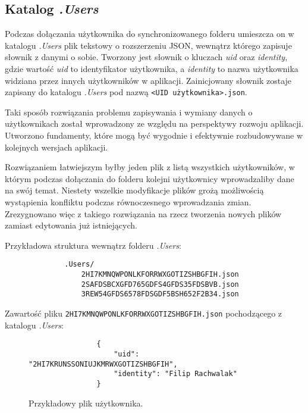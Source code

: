 \subsection{Katalog \emph{.Users}}

Podczas dołączania użytkownika do synchronizowanego folderu umieszcza on w katalogu \emph{.Users} plik tekstowy o rozszerzeniu JSON, wewnątrz którego zapisuje słownik z danymi o sobie. Tworzony jest słownik o kluczach \emph{uid} oraz \emph{identity}, gdzie wartość \emph{uid} to identyfikator użytkownika, a \emph{identity} to nazwa użytkownika widziana przez innych użytkowników w aplikacji. Zainicjowany słownik zostaje zapisany do katalogu \emph{.Users} pod nazwą \texttt{<UID użytkownika>.json}.

Taki sposób rozwiązania problemu zapisywania i wymiany danych o użytkownikach został wprowadzony ze względu na perspektywy rozwoju aplikacji. Utworzono fundamenty, które mogą być wygodnie i efektywnie rozbudowywane w kolejnych wersjach aplikacji.

Rozwiązaniem łatwiejszym byłby jeden plik z listą wszystkich użytkowników, w którym podczas dołączania do folderu kolejni użytkownicy wprowadzaliby dane na swój temat. Niestety wszelkie modyfikacje plików grożą możliwością wystąpienia konfliktu podczas równoczesnego wprowadzania zmian. Zrezygnowano więc z takiego rozwiązania na rzecz tworzenia nowych plików zamiast edytowania już istniejących.

Przykładowa struktura wewnątrz folderu \emph{.Users}:

\begin{minipage}{\linewidth}
\vspace{1em}
\begin{verbatim}
              .Users/
                  2HI7KMNQWPONLKFORRWXGOTIZSHBGFIH.json
                  2SAFDSBCXGFD765GDFS4GFDS35FDSBVB.json
                  3REW54GFDS6578FDSGDF5BSH652F2B34.json
\end{verbatim}
\vspace{1em}
\end{minipage}

Zawartość pliku \texttt{2HI7KMNQWPONLKFORRWXGOTIZSHBGFIH.json} pochodzącego z katalogu \emph{.Users}:

\begin{figure}[htb]
  \begin{verbatim}
                {
                    "uid": "2HI7KRUNSSONIUJKMRWXGOTIZSHBGFIH", 
                    "identity": "Filip Rachwalak"
                }
  \end{verbatim}
  \caption{Przykładowy plik użytkownika.}
\end{figure}

